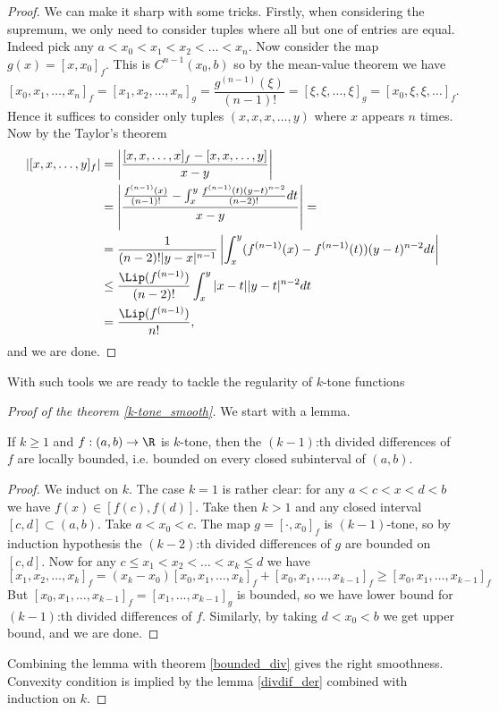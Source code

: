 \begin{proof}
	We can make it sharp with some tricks. Firstly, when considering the supremum, we only need to consider tuples where all but one of entries are equal. Indeed pick any $a < x_{0} < x_{1} < x_{2} < \ldots < x_{n}$. Now consider the map $g(x) = [x, x_{0}]_{f}$. This is $C^{n - 1}(x_{0}, b)$ so by the mean-value theorem we have
	\[
		[x_{0}, x_{1}, \ldots, x_{n}]_{f} = [x_{1}, x_{2}, \ldots, x_{n}]_{g} = \frac{g^{(n - 1)}(\xi)}{(n - 1)!} = [\xi, \xi, \ldots, \xi]_{g} = [x_{0}, \xi, \xi, \ldots]_{f}.
	\]
	Hence it suffices to consider only tuples $(x, x, x, \ldots, y)$ where $x$ appears $n$ times. Now by the Taylor's theorem
	\begin{align*}
		\left|[x, x, \ldots, y]_{f}\right| &= \left|\frac{[x, x, \ldots, x]_{f} - [x, x, \ldots, y]}{x - y} \right| \\
		&= \left|\frac{\frac{f^{(n - 1)}(x)}{(n - 1)!} - \int_{x}^{y} \frac{f^{(n - 1)}(t) (y - t)^{n - 2}}{(n - 2)!} dt}{x - y} \right| = \\
		&= \frac{1}{(n - 2)!|y - x|^{n - 1}} \left|\int_{x}^{y} (f^{(n - 1)}(x) - f^{(n - 1)}(t)) (y - t)^{n - 2} dt \right| \\
		&\leq \frac{\Lip(f^{(n - 1)})}{(n - 2)!} \int_{x}^{y} |x - t| |y - t|^{n - 2} dt \\
		&= \frac{\Lip(f^{(n - 1)})}{n!},
	\end{align*}
	and we are done.
\end{proof}

With such tools we are ready to tackle the regularity of $k$-tone functions

\begin{proof}[Proof of the theorem \ref{k-tone_smooth}]

	We start with a lemma.
	\begin{lem}
		If $k \geq 1$ and $f : (a, b) \to \R$ is $k$-tone, then the $(k - 1)$:th divided differences of $f$ are locally bounded, i.e. bounded on every closed subinterval of $(a, b)$.
	\end{lem}
	\begin{proof}
		We induct on $k$. The case $k = 1$ is rather clear: for any $a < c < x < d < b$ we have $f(x) \in [f(c), f(d)]$. Take then $k > 1$ and any closed interval $[c, d] \subset (a, b)$. Take $a < x_{0} < c$. The map $g = [\cdot, x_{0}]_{f}$ is $(k - 1)$-tone, so by induction hypothesis the $(k - 2)$:th divided differences of $g$ are bounded on $[c, d]$. Now for any $c \leq x_{1} < x_{2} < \ldots < x_{k} \leq d$ we have
		\[
			[x_{1}, x_{2}, \ldots, x_{k}]_{f} = (x_{k} - x_{0}) [x_{0}, x_{1}, \ldots, x_{k}]_{f} + [x_{0}, x_{1}, \ldots, x_{k - 1}]_{f} \geq [x_{0}, x_{1}, \ldots, x_{k - 1}]_{f}
		\]
		But $[x_{0}, x_{1}, \ldots, x_{k - 1}]_{f} = [x_{1}, \ldots, x_{k - 1}]_{g}$ is bounded, so we have lower bound for $(k - 1)$:th divided differences of $f$. Similarly, by taking $d < x_{0} < b$ we get upper bound, and we are done.
	\end{proof}
	Combining the lemma with theorem \ref{bounded_div} gives the right smoothness. Convexity condition is implied by the lemma \ref{divdif_der} combined with induction on $k$.
\end{proof}

